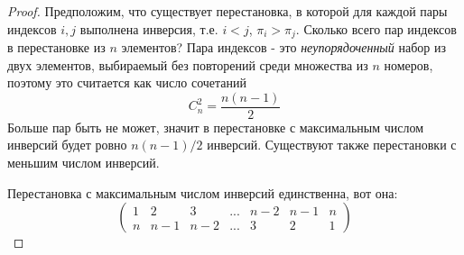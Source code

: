 \begin{proof}

Предположим, что существует перестановка, в которой для каждой пары индексов $i, j$ выполнена инверсия, т.е. $i<j$, $\pi_i>\pi_j$.
Сколько всего пар индексов в перестановке из $n$ элементов? Пара индексов - это {\em неупорядоченный} набор из двух элементов, выбираемый без повторений среди множества из $n$ номеров, поэтому это считается как число сочетаний $$C_n^2 = \frac{n(n-1)}{2}$$Больше пар быть не может, значит в перестановке с максимальным числом инверсий будет ровно $n(n-1)/2$ инверсий. Существуют также перестановки с меньшим числом инверсий. 

Перестановка с максимальным числом инверсий единственна, вот она:
$$
\begin{pmatrix}
    1 & 2 & 3 & ... & n-2 & n-1 & n \\
    n & n-1 & n-2 & ... & 3 & 2 & 1
\end{pmatrix}
$$



\end{proof}

